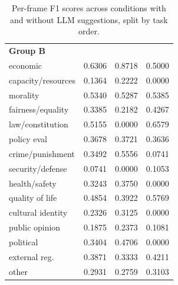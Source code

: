 \documentclass[
10pt, %
a4paper, %
oneside, %
headinclude,footinclude, %
] {book}%
\begin{document}
\begin{table}[htbp]
\begin{tabular}{lccc}
\multicolumn{4}{l}{\textbf{Group B}} \\
economic & 0.6306 & 0.8718 & 0.5000 \\
capacity/resources & 0.1364 & 0.2222 & 0.0000 \\
morality & 0.5340 & 0.5287 & 0.5385 \\
fairness/equality & 0.3385 & 0.2182 & 0.4267 \\
law/constitution & 0.5155 & 0.0000 & 0.6579 \\
policy eval & 0.3678 & 0.3721 & 0.3636 \\
crime/punishment & 0.3492 & 0.5556 & 0.0741 \\
security/defense & 0.0741 & 0.0000 & 0.1053 \\
health/safety & 0.3243 & 0.3750 & 0.0000 \\
quality of life & 0.4854 & 0.3922 & 0.5769 \\
cultural identity & 0.2326 & 0.3125 & 0.0000 \\
public opinion & 0.1875 & 0.2373 & 0.1081 \\
political & 0.3404 & 0.4706 & 0.0000 \\
external reg. & 0.3871 & 0.3333 & 0.4211 \\
other & 0.2931 & 0.2759 & 0.3103 \\
\bottomrule
\end{tabular}
\caption{Per-frame F1 scores across conditions with and without LLM suggestions, split by task order.}
\label{tab:per_frame_f1_study}
\end{table}
\end{document}
